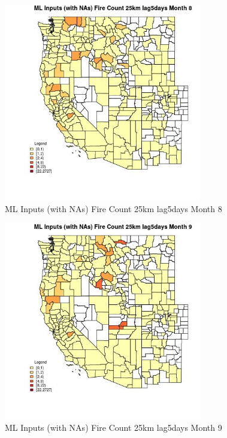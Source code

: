 \begin{figure} 
\centering  
\includegraphics[width=0.77\textwidth]{Code_Outputs/Report_ML_input_PM25_Step4_part_f_de_duplicated_aves_prioritize_24hr_obswNAs_CountyFire_Count_25km_lag5daysmedianMonth8.jpg} 
\caption{\label{fig:Report_ML_input_PM25_Step4_part_f_de_duplicated_aves_prioritize_24hr_obswNAsCountyFire_Count_25km_lag5daysmedianMonth8}ML Inputs (with NAs) Fire Count 25km lag5days Month 8} 
\end{figure} 
 

\begin{figure} 
\centering  
\includegraphics[width=0.77\textwidth]{Code_Outputs/Report_ML_input_PM25_Step4_part_f_de_duplicated_aves_prioritize_24hr_obswNAs_CountyFire_Count_25km_lag5daysmedianMonth9.jpg} 
\caption{\label{fig:Report_ML_input_PM25_Step4_part_f_de_duplicated_aves_prioritize_24hr_obswNAsCountyFire_Count_25km_lag5daysmedianMonth9}ML Inputs (with NAs) Fire Count 25km lag5days Month 9} 
\end{figure} 
 

